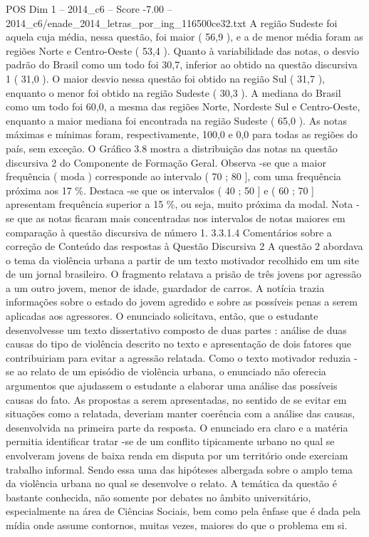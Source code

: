 \begin{textsample}{POS Dim 1 – 2014\_c6 – Score -7.00 – 2014\_c6/enade\_2014\_letras\_por\_ing\_116500ce32.txt}
A região Sudeste foi aquela cuja média, nessa questão, foi maior ( 56,9 ), e a de menor média foram as regiões Norte e Centro-Oeste ( 53,4 ).
Quanto à variabilidade das notas, o desvio padrão do Brasil como um todo foi 30,7, inferior ao obtido na questão discursiva 1 ( 31,0 ).
O maior desvio nessa questão foi obtido na região Sul ( 31,7 ), enquanto o menor foi obtido na região Sudeste ( 30,3 ).
A mediana do Brasil como um todo foi 60,0, a mesma das regiões Norte, Nordeste Sul e Centro-Oeste, enquanto a maior mediana foi encontrada na região Sudeste ( 65,0 ).
As notas máximas e mínimas foram, respectivamente, 100,0 e 0,0 para todas as regiões do país, sem exceção.
O Gráfico 3.8 mostra a distribuição das notas na questão discursiva 2 do Componente de Formação Geral.
Observa -se que a maior frequência ( moda ) corresponde ao intervalo ( 70 ; 80 ], com uma frequência próxima aos 17 \%.
Destaca -se que os intervalos ( 40 ; 50 ] e ( 60 ; 70 ] apresentam frequência superior a 15 \%, ou seja, muito próxima da modal.
Nota -se que as notas ficaram mais concentradas nos intervalos de notas maiores em comparação à questão discursiva de número 1. 3.3.1.4 Comentários sobre a correção de Conteúdo das respostas à Questão Discursiva 2 A questão 2 abordava o tema da violência urbana a partir de um texto motivador recolhido em um site de um jornal brasileiro.
O fragmento relatava a prisão de três jovens por agressão a um outro jovem, menor de idade, guardador de carros.
A notícia trazia informações sobre o estado do jovem agredido e sobre as possíveis penas a serem aplicadas aos agressores.
O enunciado solicitava, então, que o estudante desenvolvesse um texto dissertativo composto de duas partes : análise de duas causas do tipo de violência descrito no texto e apresentação de dois fatores que contribuiriam para evitar a agressão relatada.
Como o texto motivador reduzia -se ao relato de um episódio de violência urbana, o enunciado não oferecia argumentos que ajudassem o estudante a elaborar uma análise das possíveis causas do fato.
As propostas a serem apresentadas, no sentido de se evitar em situações como a relatada, deveriam manter coerência com a análise das causas, desenvolvida na primeira parte da resposta.
O enunciado era claro e a matéria permitia identificar tratar -se de um conflito tipicamente urbano no qual se envolveram jovens de baixa renda em disputa por um território onde exerciam trabalho informal.
Sendo essa uma das hipóteses albergada sobre o amplo tema da violência urbana no qual se desenvolve o relato.
A temática da questão é bastante conhecida, não somente por debates no âmbito universitário, especialmente na área de Ciências Sociais, bem como pela ênfase que é dada pela mídia onde assume contornos, muitas vezes, maiores do que o problema em si.

\end{textsample}
